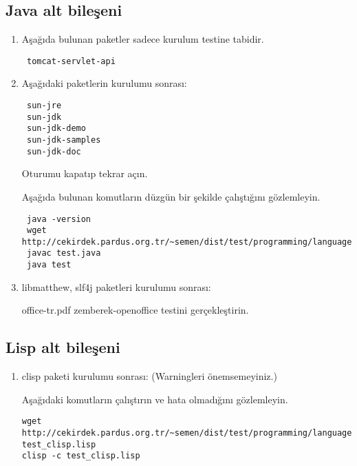 \documentclass[a4paper,10pt]{article}
\begin{document}
\subsection{Java alt bileşeni}
\begin{enumerate}
\item Aşağıda bulunan paketler sadece kurulum testine tabidir.

\begin{verbatim}
 tomcat-servlet-api
\end{verbatim}

 \item Aşağıdaki paketlerin kurulumu sonrası:
\begin{verbatim}
 sun-jre
 sun-jdk
 sun-jdk-demo
 sun-jdk-samples
 sun-jdk-doc
\end{verbatim}

Oturumu kapatıp tekrar açın.

Aşağıda bulunan komutların düzgün bir şekilde çalıştığını gözlemleyin.
\begin{verbatim}
 java -version
 wget http://cekirdek.pardus.org.tr/~semen/dist/test/programming/language/java/test.java
 javac test.java
 java test
\end{verbatim}

\item libmatthew, slf4j paketleri kurulumu sonrası:

office-tr.pdf zemberek-openoffice testini gerçekleştirin.
\end{enumerate}



\subsection{Lisp alt bileşeni}
\begin{enumerate}
 \item clisp paketi kurulumu sonrası: (Warningleri önemsemeyiniz.)

Aşağıdaki komutların çalıştırın ve hata olmadığını gözlemleyin.
\begin{verbatim}
wget http://cekirdek.pardus.org.tr/~semen/dist/test/programming/language/lisp/
test_clisp.lisp 
clisp -c test_clisp.lisp
\end{verbatim}

\end{enumerate}
\end{document}
